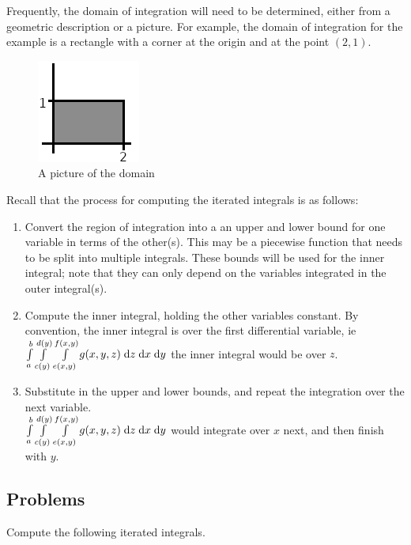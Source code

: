 \documentclass[letterpaper,11pt]{article}
\begin{document}
  Frequently, the domain of integration will need to be determined, either from a geometric description or a picture.
  For example, the domain of integration for the example is a rectangle with a corner at the origin and at the point $(2, 1)$.
  \begin{figure}[h]
    \centering \includegraphics{mech222/lecture_1a_example_domain.png}
    \caption{A picture of the domain}
  \end{figure}
  Recall that the process for computing the iterated integrals is as follows:
  \begin{enumerate}
    \item Convert the region of integration into a an upper and lower bound for one variable in terms of the other(s).
      This may be a piecewise function that needs to be split into multiple integrals.
      These bounds will be used for the inner integral; note that they can only depend on the variables integrated in the outer integral(s).
    \item Compute the inner integral, holding the other variables constant.
      By convention, the inner integral is over the first differential variable, ie
      $\int \limits_{a}^{b} \int \limits_{c(y)}^{d(y)} \int \limits_{e(x, y)}^{f(x, y)} g(x, y, z) \;\mathrm{d}z \;\mathrm{d}x \;\mathrm{d}y$
      the inner integral would be over $z$.
    \item Substitute in the upper and lower bounds, and repeat the integration over the next variable.\\
      $\int \limits_{a}^{b} \int \limits_{c(y)}^{d(y)} \int \limits_{e(x, y)}^{f(x, y)} g(x, y, z) \;\mathrm{d}z \;\mathrm{d}x \;\mathrm{d}y$
      would integrate over $x$ next, and then finish with $y$.
  \end{enumerate}
  \subsection*{Problems}
  Compute the following iterated integrals.
\end{document}
